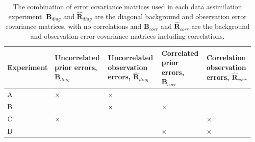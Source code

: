 \documentclass[11pt]{article}
\begin{document}
\begin{table}[ht] 
\begin{center}
	\begin{tabularx}{\textwidth}{| l | X | X | X | X |}
	\hline
	Experiment & Uncorrelated prior errors, $\textbf{B}_{diag}$ & Uncorrelated observation errors, $\hat{\mathbf{R}}_{diag}$ & Correlated prior errors, $\textbf{B}_{corr}$ &
	Correlation observation errors, $\hat{\mathbf{R}}_{corr}$ \\ \hline
	A & $\times$ & $\times$ & & \\ \hline
	B & & $\times$ & $\times$ & \\ \hline
	C & $\times$ & & & $\times$ \\ \hline
	D & & & $\times$ & $\times$ \\ 
	\hline
	\end{tabularx}
	\caption{The combination of error covariance matrices used in each data assimilation experiment. $\textbf{B}_{diag}$ and $\hat{\mathbf{R}}_{diag}$ are the diagonal background and observation error covariance matrices, with no correlations and $\textbf{B}_{corr}$ and $\hat{\mathbf{R}}_{corr}$ are the background and observation error covariance matrices including correlations.}
	\label{table:exps_tab}
\end{center} 
\end{table}

{}
%
\end{document}
